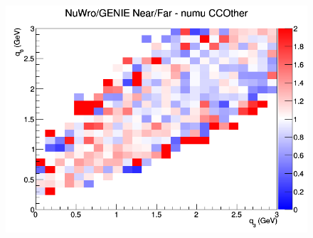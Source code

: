 \begin{figure}[h]
\endminipage
{}
\includegraphics[width=\linewidth]{eff_q0_q3/FGT/ratios/CCOther_NuWro_GENIE_numu_NF_q3_q0.png}
\endminipage
\newline
\end{figure}
\clearpage
